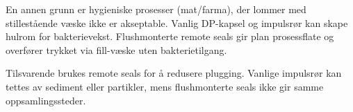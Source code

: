En annen grunn er hygieniske prosesser (mat/farma), der lommer med stillestående væske ikke er akseptable.  Vanlig DP-kapsel og impulsrør kan skape hulrom for bakterievekst.  Flushmonterte remote seals gir plan prosessflate og overfører trykket via fill-væske uten bakterietilgang.

Tilsvarende brukes remote seals for å redusere plugging.  Vanlige impulsrør kan tettes av sediment eller partikler, mens flushmonterte seals ikke gir samme oppsamlingssteder.










